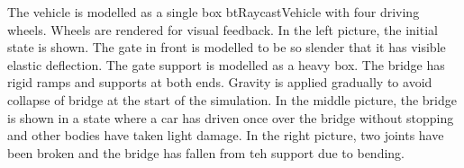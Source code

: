 The vehicle is modelled as a single box btRaycastVehicle with four driving wheels. Wheels are rendered for visual feedback.
In the left picture, the initial state is shown. 
The gate in front is modelled to be so slender that it has visible elastic deflection.
The gate support is modelled as a heavy box.
The bridge has rigid ramps and supports at both ends.
Gravity is applied gradually to avoid collapse of bridge at the start of the simulation.
In the middle picture, the bridge is shown in a state where a car has driven once over the bridge without stopping and
other bodies have taken light damage.
In the right picture, two joints have been broken and the bridge has fallen from teh support due to bending.

